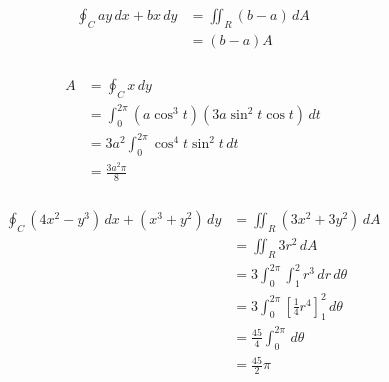 \documentclass{article}
\begin{document}
\setcounter{subsubsection}{14}
\subsubsection{}

\begin{align*}
  \oint_C a y \,dx + b x \,dy & = \iint_R (b - a) \,dA \\
                              & = (b - a) A
\end{align*}

\setcounter{subsubsection}{18}
\subsubsection{}

\begin{align*}
  A & = \oint_C x \,dy                                         \\
    & = \int_0^{2 \pi} (a \cos^3 t) (3 a \sin^2 t \cos t) \,dt \\
    & = 3 a^2 \int_0^{2 \pi} \cos^4 t \sin^2 t \,dt            \\
    & = \frac{3 a^2 \pi}{8}
\end{align*}

\setcounter{subsubsection}{22}
\subsubsection{}

\begin{align*}
  \oint_C (4 x^2 - y^3) \,dx + (x^3 + y^2) \,dy & = \iint_R (3 x^2 + 3 y^2) \,dA                                  \\
                                                & = \iint_R 3 r^2 \,dA                                            \\
                                                & = 3 \int_0^{2 \pi} \int_1^2 r^3 \,dr \,d\theta                  \\
                                                & = 3 \int_0^{2 \pi} \left[ \frac{1}{4} r^4 \right]_1^2 \,d\theta \\
                                                & = \frac{45}{4} \int_0^{2 \pi} \,d\theta                         \\
                                                & = \frac{45}{2} \pi
\end{align*}

\setcounter{subsubsection}{24}
\subsubsection{}
\end{document}
